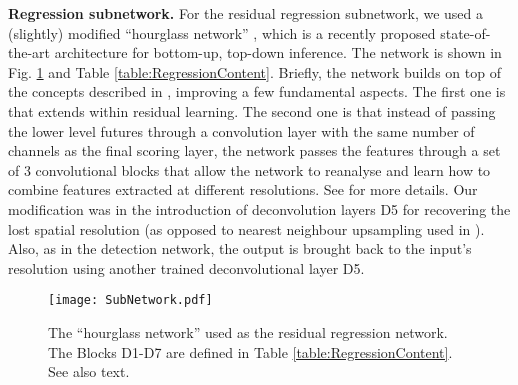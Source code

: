 \documentclass[runningheads]{llncs}
\begin{document}
\textbf{Regression subnetwork.} For the residual regression subnetwork, we used a (slightly) modified ``hourglass network'' \cite{newell2016stacked}, which is a recently proposed state-of-the-art architecture for bottom-up, top-down inference. The network is shown in Fig. \ref{fig:RegressionContent} and Table \ref{table:RegressionContent}. Briefly, the network builds on top of the concepts described in \cite{long2015fully}, improving a few fundamental aspects. The first one is that extends \cite{long2015fully} within residual learning. 
The second one is that instead of passing the lower level futures through a convolution layer with the same number of channels as the final scoring layer, the network passes the features through a set of 3 convolutional blocks that allow the network to reanalyse and learn how to combine features extracted at different resolutions. See \cite{newell2016stacked} for more details. Our modification was in the introduction of deconvolution layers D5 for recovering the lost spatial resolution (as opposed to nearest neighbour upsampling used in \cite{newell2016stacked}). Also, as in the detection network, the output is brought back to the input's resolution using another trained deconvolutional layer D5.


\iffalse
\begin{figure*}[t]
\begin{subfigure}{\textwidth}
\centering 
\texttt{[image: SubNetwork.pdf]}
\caption{Residual regression network. Except for the first and the last three layers, all the depicted rectangles represent bottleneck blocks with full preactivation. Each of the pooled higher resolution features are passed through a set of three bottleneck blocks and are afterwards summed element wise. For each branch the resolution is recovered with the help of trainable deconvolution layers.}
\label{fig:OurRegNetworka}
\end{subfigure}
\begin{subfigure}{\textwidth}
\centering 
\texttt{[image: PreActivationBlock.pdf]}
\caption{Each block from the regression subnetwork is a so called Bottleneck layer with full preactivation, as defined in \cite{he2016identity}. The first convolutional layer has 128 channels (128,1x1,1x1), the second 128 (128,3x3,1x1) and the third 256 (256,1x1,1x1).}
\label{fig:OurRegNetworkb}
\end{subfigure}
\label{fig:OurRegNetwork}
\caption{}
\end{figure*}  
\fi

\begin{figure}[t]
\centering 
\texttt{[image: SubNetwork.pdf]}
\caption{The ``hourglass network'' \cite{newell2016stacked} used as the residual regression network. The Blocks D1-D7 are defined in Table \ref{table:RegressionContent}. See also text.}
\label{fig:RegressionContent}
\end{figure} 
\end{document}
